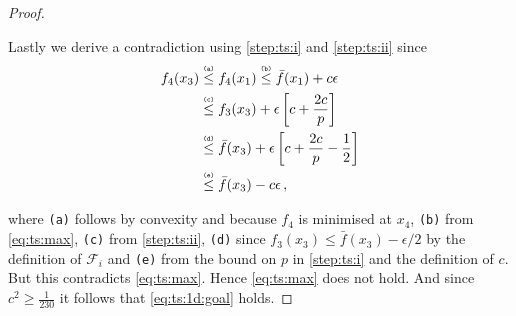 \documentclass[letter, 12pt]{report}
\newcommand{\explan}[1]{\stackrel{\text{\tiny \texttt{#1}}}}
\newcommand{\sF}{\mathscr F}
\newcommand{\1}{\mathbf{1}}
\theoremstyle{plain}
\theoremstyle{definition}
\theoremstyle{remark}
\begin{document}
\begin{proof}
\begin{enumsteps}
        \item \label{step:ts:iii}
        Lastly we derive a contradiction using \ref{step:ts:i} and \ref{step:ts:ii} since
        \begin{align*}
            f_4(x_3)
             & \explan{(a)}\leq f_4(x_1)
            \explan{(b)}\leq \bar f(x_1) + c\epsilon                                              \\
             & \explan{(c)}\leq f_3(x_3) + \epsilon\left[c + \frac{2c}{p}\right]                  \\
             & \explan{(d)}\leq \bar f(x_3) + \epsilon\left[c + \frac{2c}{p} - \frac{1}{2}\right] \\
             & \explan{(e)}\leq \bar f(x_3) - c \epsilon \,,
        \end{align*}
    \end{enumsteps}
    where \texttt{(a)} follows by convexity and because $f_4$ is minimised at $x_4$,
    \texttt{(b)} from \cref{eq:ts:max},
    \texttt{(c)} from \ref{step:ts:ii},
    \texttt{(d)} since $f_3(x_3) \leq \bar f(x_3) - \epsilon/2$ by the definition of $\sF_i$
    and \texttt{(e)} from the bound on $p$ in \ref{step:ts:i} and the definition of $c$.
    But this contradicts \cref{eq:ts:max}.
    Hence \cref{eq:ts:max} does not hold. And since $c^2 \geq \frac{1}{230}$ it follows that \cref{eq:ts:1d:goal} holds.
\end{proof}
\end{document}
